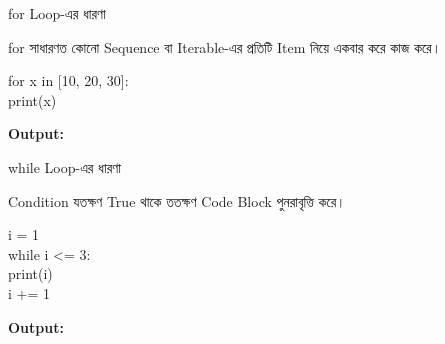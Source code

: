 \noindent
\begin{minipage}[t]{0.49\linewidth}

\begin{sideexamplebox}{\textenglish{\ttfamily for} Loop-এর ধারণা}

\textenglish{\ttfamily for}
সাধারণত কোনো Sequence বা Iterable-এর প্রতিটি Item নিয়ে
একবার করে কাজ করে।

\begin{sidecodebox}
\begin{english}
\ttfamily
for x in [10, 20, 30]:\\
\hspace*{4mm}print(x)
\end{english}
\end{sidecodebox}

\textbf{Output:}

\begin{center}
\textenglish{  }
\end{center}

\end{sideexamplebox}

\end{minipage}
\hfill
\begin{minipage}[t]{0.49\linewidth}

\begin{sideexamplebox}{\textenglish{\ttfamily while} Loop-এর ধারণা}

Condition যতক্ষণ True থাকে ততক্ষণ Code Block পুনরাবৃত্তি করে।

\begin{sidecodebox}
\begin{english}
\ttfamily
i = 1\\
while i <= 3:\\
\hspace*{4mm}print(i)\\
\hspace*{4mm}i += 1
\end{english}
\end{sidecodebox}

\textbf{Output:}

\begin{center}
\textenglish{  }
\end{center}

\end{sideexamplebox}

\end{minipage}

